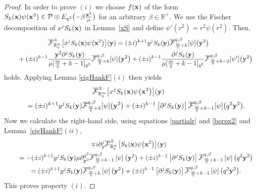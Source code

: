 \documentclass[pdftex]{sigma}
\newcommand{\mR}{\mathbb{R}}
\newcommand{\cF}{\mathcal{F}}
\newcommand{\cP}{\mathcal{P}}
\numberwithin{equation}{section}
\begin{document}
\begin{proof}
In order to prove $(i)$ we choose $f(\bold{x})$ of the form $S_k(\bold{x})\psi(\bold{x}^2)\in \cP\otimes E_{q^2}\big({-}\beta\frac{\bold{x}^2}{\mu}\big)$ for an arbitrary $\beta\in\mR^+$. We use the Fischer decomposition of $x^jS_k(\bold{x})$ in Lemma~\ref{xS} and def\/ine $\psi'(r^2)=r^2\psi(r^2)$. Then,
\begin{gather*}
\overline{\cF}_{\mR_q^m}^{\pm}\big[x^jS_k(\bold{x})\psi\big(\bold{x}^2\big)\big](\bold{y}) = (\pm i)^{k+1}y^jS_{k}(\bold{y})\overline{\cF}^{q,\beta}_{\frac{m}{2}+k}[\psi]\big(\bold{y}^2\big)\\
\qquad{}
+(\pm i)^{k-1}\frac{\bold{y}^2\partial^jS_{k}(\bold{y})}{\mu[\frac{m}{2}+k-1]_{q^2}}\overline{\cF}^{q,\beta}_{\frac{m}{2}+k}[\psi]\big(\bold{y}^2\big)
 + (\pm i)^{k-1}\frac{\partial^jS_{k}(\bold{y})}{\mu[\frac{m}{2}+k-1]_{q^2}}\overline{\cF}^{q,\beta}_{\frac{m}{2}+k-2}[\psi']\big(\bold{y}^2\big)
\end{gather*}
holds. Applying Lemma \ref{eigHankF}$(i)$ then yields
\begin{gather*}
\overline{\cF}_{\mR_q^m}^{\pm}\big[x^jS_k(\bold{x})\psi\big(\bold{x}^2\big)\big](\bold{y}) \\
\qquad{} = (\pm i)^{k+1}y^jS_{k}(\bold{y})\overline{\cF}^{q,\beta}_{\frac{m}{2}+k}[\psi]\big(\bold{y}^2\big)+(\pm i)^{k-1}\left[\partial^jS_{k}(\bold{y})\right]\overline{\cF}^{q,\beta}_{\frac{m}{2}+k-1}[\psi]\big(q^2\bold{y}^2\big).
\end{gather*}
Now we calculate the right-hand side, using equations \eqref{partialr} and \eqref{berpx2} and Lemma~\ref{eigHankF}$(ii)$,
\begin{gather*}
\mp i\partial_y^j\overline{\cF}_{\mR_q^m}^{\pm}\big[S_k(\bold{x})\psi\big(\bold{x}^2\big)\big](\bold{y})\\
 \qquad {} = -(\pm i)^{k+1}y^jS_k(\bold{y})\mu\partial_{\bold{y}^2}^{q^2}\overline{\cF}^{q,\beta}_{\frac{m}{2}+k-1}\left[\psi\right]\big(\bold{y}^2\big)
 + (\pm i)^{k-1}\left[\partial^jS_k(\bold{y})\right]\overline{\cF}^{q,\beta}_{\frac{m}{2}+k-1}\left[\psi\right]\big(q^2\bold{y}^2\big)\\
\qquad{} = (\pm i)^{k+1}y^jS_k(\bold{y})\overline{\cF}^{q,\beta}_{\frac{m}{2}+k}\left[\psi\right]\big(\bold{y}^2\big)
 + (\pm i)^{k-1}\left[\partial^jS_k(\bold{y})\right]\overline{\cF}^{q,\beta}_{\frac{m}{2}+k-1}\left[\psi\right]\big(q^2\bold{y}^2\big).
\end{gather*}
This proves property $(i)$.


\end{proof}
\end{document}
